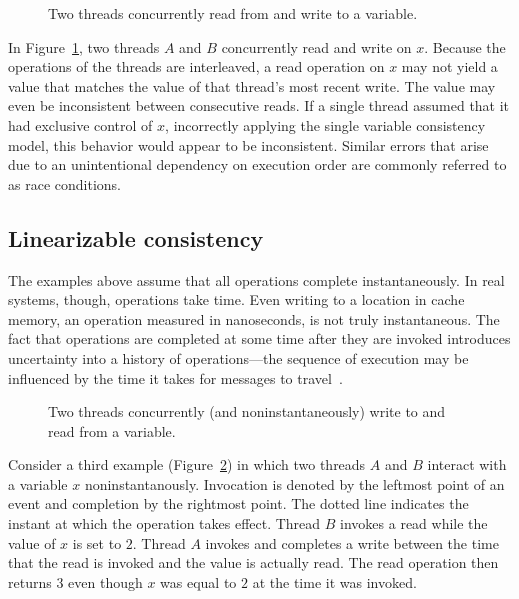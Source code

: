 \documentclass{sig-alternate}
\begin{document}
\begin{figure}[ht]
  \centering
  \resizebox{0.85\linewidth}{!}{}
  \caption{Two threads concurrently read from and write to a variable.}
\label{figure:multiple}
\end{figure}

In Figure~\ref{figure:multiple}, two threads $A$ and $B$ concurrently read and write on $x$. Because the operations of the threads are interleaved, a read operation on $x$ may not yield a value that matches the value of that thread's most recent write. The value may even be inconsistent between consecutive reads. If a single thread assumed that it had exclusive control of $x$, incorrectly applying the single variable consistency model, this behavior would appear to be inconsistent. Similar errors that arise due to an unintentional dependency on execution order are commonly referred to as race conditions.

\subsection{Linearizable consistency}

The examples above assume that all operations complete instantaneously. In real systems, though, operations take time. Even writing to a location in cache memory, an operation measured in nanoseconds, is not truly instantaneous. The fact that operations are completed at some time after they are invoked introduces uncertainty into a history of operations---the sequence of execution may be influenced by the time it takes for messages to travel~\cite{Kingsbury2014}.

\begin{figure}[ht]
  \centering
  \resizebox{0.8\linewidth}{!}{}
  \caption{Two threads concurrently (and noninstantaneously) write to and read from a variable.}
\label{figure:time}
\end{figure}

Consider a third example (Figure~\ref{figure:time}) in which two threads $A$ and $B$ interact with a variable $x$ noninstantanously. Invocation is denoted by the leftmost point of an event and completion by the rightmost point. The dotted line indicates the instant at which the operation takes effect. Thread $B$ invokes a read while the value of $x$ is set to $2$. Thread $A$ invokes and completes a write between the time that the read is invoked and the value is actually read. The read operation then returns $3$ even though $x$ was equal to $2$ at the time it was invoked.
\end{document}
